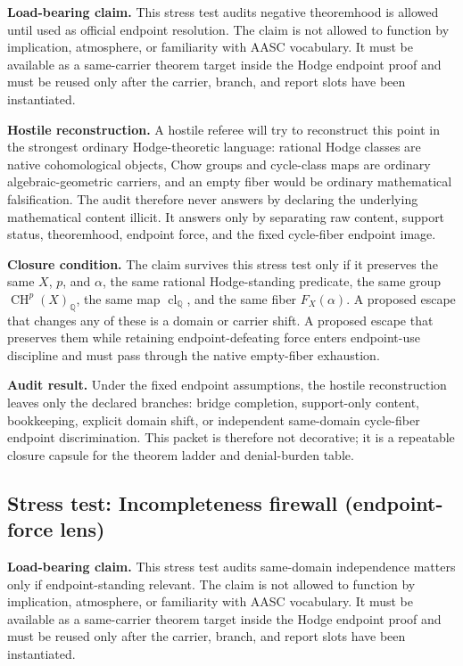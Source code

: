 \documentclass[11pt]{article}
\newcommand{\QQ}{\mathbb{Q}}
\newcommand{\CH}{\operatorname{CH}}
\newcommand{\clQ}{\operatorname{cl}_{\QQ}}
\begin{document}
\par\noindent\textbf{Load-bearing claim.} This stress test audits negative theoremhood is allowed until used as official endpoint resolution. The claim is not allowed to function by implication, atmosphere, or familiarity with AASC vocabulary. It must be available as a same-carrier theorem target inside the Hodge endpoint proof and must be reused only after the carrier, branch, and report slots have been instantiated.

\par\noindent\textbf{Hostile reconstruction.} A hostile referee will try to reconstruct this point in the strongest ordinary Hodge-theoretic language: rational Hodge classes are native cohomological objects, Chow groups and cycle-class maps are ordinary algebraic-geometric carriers, and an empty fiber would be ordinary mathematical falsification. The audit therefore never answers by declaring the underlying mathematical content illicit. It answers only by separating raw content, support status, theoremhood, endpoint force, and the fixed cycle-fiber endpoint image.

\par\noindent\textbf{Closure condition.} The claim survives this stress test only if it preserves the same $X$, $p$, and $\alpha$, the same rational Hodge-standing predicate, the same group $\CH^p(X)_\QQ$, the same map $\clQ$, and the same fiber $F_X(\alpha)$. A proposed escape that changes any of these is a domain or carrier shift. A proposed escape that preserves them while retaining endpoint-defeating force enters endpoint-use discipline and must pass through the native empty-fiber exhaustion.

\par\noindent\textbf{Audit result.} Under the fixed endpoint assumptions, the hostile reconstruction leaves only the declared branches: bridge completion, support-only content, bookkeeping, explicit domain shift, or independent same-domain cycle-fiber endpoint discrimination. This packet is therefore not decorative; it is a repeatable closure capsule for the theorem ladder and denial-burden table.


\subsection{Stress test: Incompleteness firewall (endpoint-force lens)}

\par\noindent\textbf{Load-bearing claim.} This stress test audits same-domain independence matters only if endpoint-standing relevant. The claim is not allowed to function by implication, atmosphere, or familiarity with AASC vocabulary. It must be available as a same-carrier theorem target inside the Hodge endpoint proof and must be reused only after the carrier, branch, and report slots have been instantiated.
\end{document}
